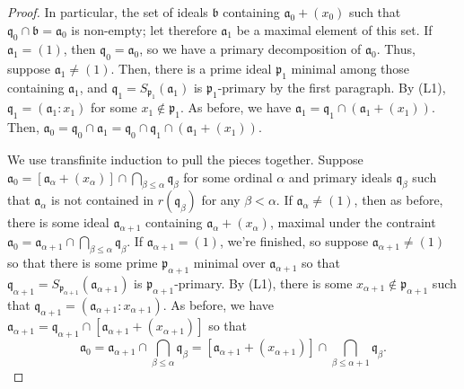 \begin{proof}
In particular, the set of ideals $\mathfrak{b}$ containing $\mathfrak{a}_0 + (x_0)$ such that $\mathfrak{q}_0 \cap \mathfrak{b} = \mathfrak{a}_0$ is non-empty; let therefore $\mathfrak{a}_1$ be a maximal element of this set. If
$\mathfrak{a}_1 = (1)$, then $\mathfrak{q}_0 = \mathfrak{a}_0$, so we have a primary decomposition of $\mathfrak{a}_0$. Thus, suppose $\mathfrak{a}_1 \neq (1)$. Then, there is a prime ideal $\mathfrak{p}_1$ minimal among those
containing $\mathfrak{a}_1$, and $\mathfrak{q}_1 = S_{\mathfrak{p}_1}(\mathfrak{a}_1)$ is $\mathfrak{p}_1$-primary by the first paragraph. By (L1), $\mathfrak{q}_1 = (\mathfrak{a}_1 : x_1)$ for some $x_1 \not\in \mathfrak{p}_1$.
As before, we have $\mathfrak{a}_1 = \mathfrak{q}_1 \cap (\mathfrak{a}_1 + (x_1))$. Then, $\mathfrak{a}_0 = \mathfrak{q}_0 \cap \mathfrak{a}_1 = \mathfrak{q}_0 \cap \mathfrak{q}_1 \cap (\mathfrak{a}_1 + (x_1))$.

We use transfinite induction to pull the pieces together. Suppose $\mathfrak{a}_0 = [\mathfrak{a}_\alpha + (x_\alpha)]\cap \bigcap_{\beta \le \alpha} \mathfrak{q}_{\beta}$ for some ordinal $\alpha$ 
and primary ideals $\mathfrak{q}_{\beta}$ such that $\mathfrak{a}_{\alpha}$ is not contained in $r(\mathfrak{q}_{\beta})$ for any $\beta < \alpha$. If $\mathfrak{a}_{\alpha} \neq (1)$, then as before,
there is some ideal $\mathfrak{a}_{\alpha + 1}$ containing $\mathfrak{a}_{\alpha} + (x_{\alpha})$, maximal under the contraint $\mathfrak{a}_0 = \mathfrak{a}_{\alpha + 1} \cap \bigcap_{\beta \le \alpha} \mathfrak{q}_{\beta}$.
If $\mathfrak{a}_{\alpha + 1} = (1)$, we're finished, so suppose $\mathfrak{a}_{\alpha + 1} \neq (1)$ so that there is some prime $\mathfrak{p}_{\alpha + 1}$ minimal over $\mathfrak{a}_{\alpha + 1}$ so that
$\mathfrak{q}_{\alpha + 1} = S_{\mathfrak{p}_{\alpha + 1}}(\mathfrak{a}_{\alpha + 1})$ is $\mathfrak{p}_{\alpha + 1}$-primary. By (L1), there is some $x_{\alpha + 1} \not\in \mathfrak{p}_{\alpha + 1}$ such that
$\mathfrak{q}_{\alpha + 1} = (\mathfrak{a}_{\alpha+1} : x_{\alpha+1})$. As before, we have $\mathfrak{a}_{\alpha+1} = \mathfrak{q}_{\alpha+1} \cap [\mathfrak{a}_{\alpha+1} + (x_{\alpha + 1})]$ so that
$$\mathfrak{a}_0 = \mathfrak{a}_{\alpha+1} \cap \bigcap_{\beta \le \alpha} \mathfrak{q}_{\beta} = [\mathfrak{a}_{\alpha + 1} + (x_{\alpha+1})] \cap \bigcap_{\beta \le \alpha + 1}\mathfrak{q}_{\beta}.$$


\end{proof}
